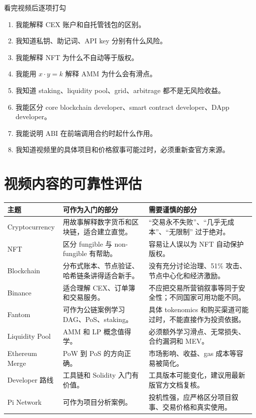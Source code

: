 \documentclass[UTF8,11pt]{ctexart}
\begin{document}
\begin{practicebox}{看完视频后逐项打勾}
\begin{enumerate}
  \item 我能解释 CEX 账户和自托管钱包的区别。
  \item 我知道私钥、助记词、API key 分别有什么风险。
  \item 我能解释 NFT 为什么不自动等于版权。
  \item 我能用 \(x\cdot y=k\) 解释 AMM 为什么会有滑点。
  \item 我知道 staking、liquidity pool、grid、arbitrage 都不是无风险收益。
  \item 我能区分 core blockchain developer、smart contract developer、DApp developer。
  \item 我能说明 ABI 在前端调用合约时起什么作用。
  \item 我知道视频里的具体项目和价格叙事可能过时，必须重新查官方来源。
\end{enumerate}
\end{practicebox}

\section{视频内容的可靠性评估}
\label{sec:pitfalls}

\begin{longtable}{>{\raggedright\arraybackslash}p{4cm}>{\raggedright\arraybackslash}p{5.1cm}>{\raggedright\arraybackslash}p{5.3cm}}
\toprule
\textbf{主题} & \textbf{可作为入门的部分} & \textbf{需要谨慎的部分} \\
\midrule
\endhead
Cryptocurrency & 用故事解释数字货币和区块链，适合建立直觉。 & ``交易永不失败''、``几乎无成本''、``无限制'' 过于绝对。 \\
NFT & 区分 fungible 与 non-fungible 有帮助。 & 容易让人误以为 NFT 自动保护版权。 \\
Blockchain & 分布式账本、节点验证、哈希链条讲得适合新手。 & 没有充分讨论治理、51\% 攻击、节点中心化和经济激励。 \\
Binance & 适合理解 CEX、订单簿和交易服务。 & 不应把交易所营销叙事等同于安全性；不同国家可用功能不同。 \\
Fantom & 可作为公链案例学习 DAG、PoS、staking。 & 具体 tokenomics 和购买渠道可能过时，不能直接作为投资依据。 \\
Liquidity Pool & AMM 和 LP 概念值得学。 & 必须额外学习滑点、无常损失、合约漏洞和 MEV。 \\
Ethereum Merge & PoW 到 PoS 的方向正确。 & 市场影响、收益、gas 成本等容易被简化。 \\
Developer 路线 & 工具链和 Solidity 入门有价值。 & 工具版本可能变化，建议用最新版官方文档复核。 \\
Pi Network & 可作为项目分析案例。 & 投机性强，应严格区分项目叙事、交易价格和真实使用。 \\
\bottomrule
\end{longtable}
\end{document}
